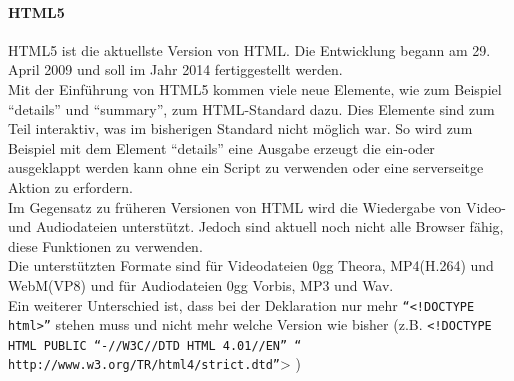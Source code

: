 \paragraph{HTML5}
HTML5 ist die aktuellste Version von HTML. Die Entwicklung begann am 29. April 2009 und soll im Jahr 2014 fertiggestellt werden.\\ 
Mit der Einführung von HTML5 kommen viele neue Elemente, wie zum Beispiel \enquote{details} und \enquote{summary}, zum HTML-Standard dazu. Dies Elemente sind zum Teil interaktiv, was im bisherigen Standard nicht möglich war. So wird zum Beispiel mit dem Element \enquote{details} eine Ausgabe erzeugt die ein-oder ausgeklappt werden kann ohne ein Script zu verwenden oder eine serverseitge Aktion zu erfordern.\\
Im Gegensatz zu früheren Versionen von HTML wird die Wiedergabe von Video- und Audiodateien unterstützt. Jedoch sind aktuell noch nicht alle Browser fähig, diese Funktionen zu verwenden.\\
Die unterstützten Formate sind für Videodateien 0gg Theora, MP4(H.264) und WebM(VP8) und für Audiodateien 0gg Vorbis, MP3 und Wav. \\
Ein weiterer Unterschied ist, dass bei der Deklaration nur mehr \texttt{\enquote{<!DOCTYPE html>}} stehen muss und nicht mehr welche Version wie bisher (z.B. \texttt{<!DOCTYPE HTML PUBLIC \enquote{-//W3C//DTD HTML 4.01//EN} \enquote{ http://www.w3.org/TR/html4/strict.dtd}}> )
\begin{description}
\item[]
\end{description}